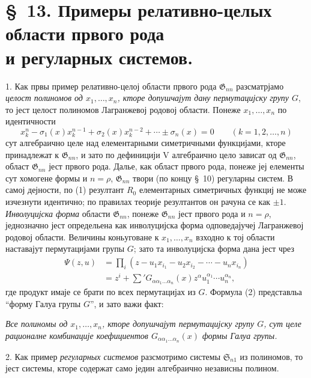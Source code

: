 ﻿\documentclass[11pt]{article}
\providecommand{\Ssys}{\mathfrak{S}}
\providecommand{\Gdom}{\mathfrak{G}}
\begin{document}
\section*{\S\ 13. Примеры релативно-целых области првого рода\\ и регуларных системов.}

1. Как првы пример релативно-целој области првого рода $\Gdom_{nn}$ разсматрјамо {\itshape целост полиномов од $x_1,\ldots,x_n$, кторе допушчајут дану пермутацијску групу $G$}, то јест целост полиномов Лагранжевој родовој области. Понеже $x_1,\ldots,x_n$ по идентичности
\begin{equation}
  x_k^n-\sigma_1(x)x_k^{n-1}+\sigma_2(x)x_k^{n-2}+\cdots\pm\sigma_n(x)=0
  \qquad(k=1,2,\ldots,n)
\tag{1}
\end{equation}
сут алгебраично целе над елементарными симетричными функцијами, кторе принадлежат к $\Gdom_{nn}$, и зато по дефиницији V алгебраично цело зависат од $\Gdom_{nn}$, област $\Gdom_{nn}$ јест првого рода. Далье, как област првого рода, понеже јеј елементы сут хомогене формы и $n=\rho$, $\Gdom_{nn}$ твори (по концу \S\ 10) регуларны систем. В самој дејности, по (1) резултант $R_0$ елементарных симетричных функциј не може изчезнути идентично; по правилах теорије резултантов он рачуна се как $\pm1$. {\itshape Инволуцијска форма} области $\Gdom_{nn}$, понеже $\Gdom_{nn}$ јест првого рода и $n=\rho$, једнозначно јест определьена как инволуцијска форма одповедајучеј Лагранжевој родовој области. Величины коньуговане к $x_1,\ldots,x_n$ взходно к тој области наставајут пермутацијами групы $G$; зато та инволуцијска форма дана јест чрез
\begin{equation}
\begin{aligned}
  \Psi(z,u)&=\prod_i
  (z-u_1x_{i_1}-u_2x_{i_2}-\cdots-u_nx_{i_n})\\
  &=z^i+\sum{}'G_{\alpha\alpha_1\ldots\alpha_n}(x)
  z^\alpha u_1^{\alpha_1}\cdots u_n^{\alpha_n},
\end{aligned}
\tag{2}
\end{equation}
где продукт имаје се брати по всех пермутацијах из $G$. Формула (2) представльа ``форму Галуа групы $G$'', и зато важи факт:

{\itshape Все полиномы од $x_1,\ldots,x_n$, кторе допушчајут пермутацијску групу $G$, сут целе рационалне комбинације коефициентов $G_{\alpha\alpha_1\ldots\alpha_n}(x)$ формы Галуа групы.}

2. Как пример {\itshape регуларных системов} разсмотримо системы $\Ssys_{n1}$ из полиномов, то јест системы, кторе содержат само једин алгебраично независны полином.
\end{document}
